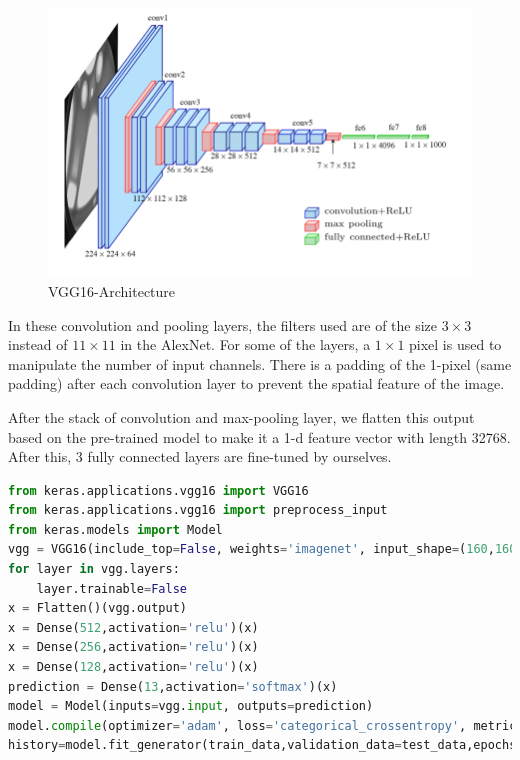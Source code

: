 \begin{figure}[H]
    \centering\includegraphics[width=12cm]{./figures/VGG16.png}
    \caption{VGG16-Architecture}
    \label{pic:vgg16}
\end{figure}

In these convolution and pooling layers, the filters used are of the size $3\times 3$ instead of $11\times 11$ in the AlexNet. For some of the layers, a $1\times 1$ pixel is used to manipulate the number of input channels. There is a padding of the 1-pixel (same padding) after each convolution layer to prevent the spatial feature of the image.

After the stack of convolution and max-pooling layer, we flatten this output based on the pre-trained model to make it a 1-d feature vector with length 32768. After this, 3 fully connected layers are fine-tuned by ourselves.

\begin{lstlisting}[language=python]
from keras.applications.vgg16 import VGG16
from keras.applications.vgg16 import preprocess_input
from keras.models import Model
vgg = VGG16(include_top=False, weights='imagenet', input_shape=(160,160,3))
for layer in vgg.layers:
    layer.trainable=False
x = Flatten()(vgg.output)
x = Dense(512,activation='relu')(x)
x = Dense(256,activation='relu')(x)
x = Dense(128,activation='relu')(x)
prediction = Dense(13,activation='softmax')(x)
model = Model(inputs=vgg.input, outputs=prediction)
model.compile(optimizer='adam', loss='categorical_crossentropy', metrics=['accuracy'],weighted_metrics=[tf.keras.metrics.Precision(), tf.keras.metrics.Recall()])
history=model.fit_generator(train_data,validation_data=test_data,epochs=20,steps_per_epoch=len(train_data),alidation_steps=len(test_data))
\end{lstlisting}
\vspace{-0.6cm}

